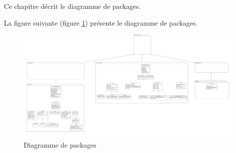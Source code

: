 Ce chapitre décrit le diagramme de packages.

La figure suivante (figure \ref{diagrammePackages}) présente le diagramme de packages.
\begin{figure}[H]
	\centering
	\includegraphics[scale=0.12]{images/diagrammePackages/diagrammeDePackages.png}
	\caption{Diagramme de packages}
	\label{diagrammePackages}
\end{figure}